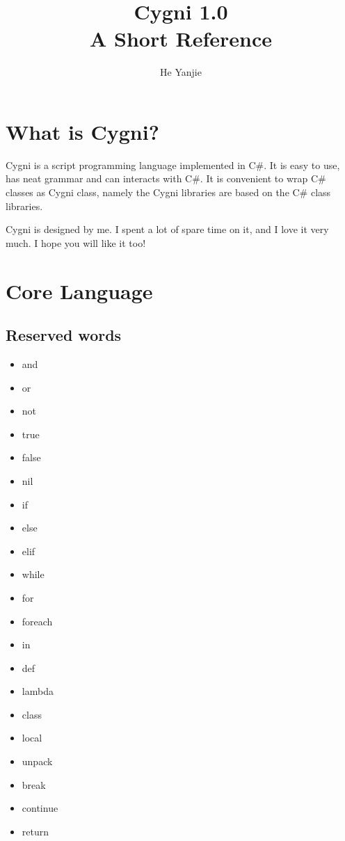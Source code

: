 \documentclass[]{article}
\title{Cygni 1.0\\ A Short Reference}
\author{He Yanjie}
\begin{document}
\maketitle

\begin{abstract}

\end{abstract}

\section{What is Cygni?}
Cygni is a script programming language implemented in C\#. It is easy to use, has neat grammar and can interacts with C\#. It is convenient to wrap C\# classes as Cygni class, namely the Cygni libraries are based on the C\# class libraries.

Cygni is designed by me. I spent a lot of spare time on it, and I love it very much. I hope you will like it too!

\section{Core Language}
\subsection{Reserved words}
\begin{itemize}
	\item and
	\item or
	\item not
	\item true
	\item false
	\item nil
	\item if
	\item else
	\item elif
	\item while
	\item for
	\item foreach
	\item in
	\item def
	\item lambda
	\item class
	\item local
	\item unpack
	\item break
	\item continue
	\item return	
\end{itemize}
\end{document}

